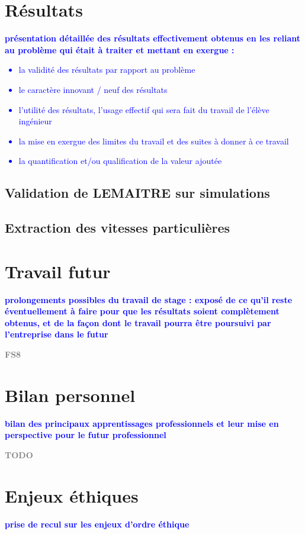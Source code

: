 \documentclass{book}
\newcommand{\todo}[1]{{\textcolor{gray}{\bf \large #1}}}
\newcommand{\consignes}[1]{{\textcolor{blue}{\bf \large #1}}}
\begin{document}
\chapter{Résultats}
\consignes{présentation détaillée des résultats effectivement obtenus en les reliant au problème qui était à traiter et mettant en exergue :
\begin{itemize}
\item la validité des résultats par rapport au problème
\item le caractère innovant / neuf des résultats
\item l’utilité des résultats, l’usage effectif qui sera fait du travail de l’élève ingénieur
\item la mise en exergue des limites du travail et des suites à donner à ce travail
\item la quantification et/ou qualification de la valeur ajoutée
\end{itemize}}


\section{Validation de LEMAITRE sur simulations}



\section{Extraction des vitesses particulières}



\chapter{Travail futur}
\consignes{prolongements possibles du travail de stage : exposé de ce qu’il reste éventuellement à faire pour que les résultats soient complètement obtenus, et de la façon dont le travail pourra être poursuivi par l’entreprise dans le futur}

\todo{FS8}

\chapter{Bilan personnel}
\consignes{bilan des principaux apprentissages professionnels et leur mise en perspective pour le futur professionnel}

\todo{TODO}

\chapter{Enjeux éthiques}
\consignes{prise de recul sur les enjeux d’ordre éthique}
\end{document}
